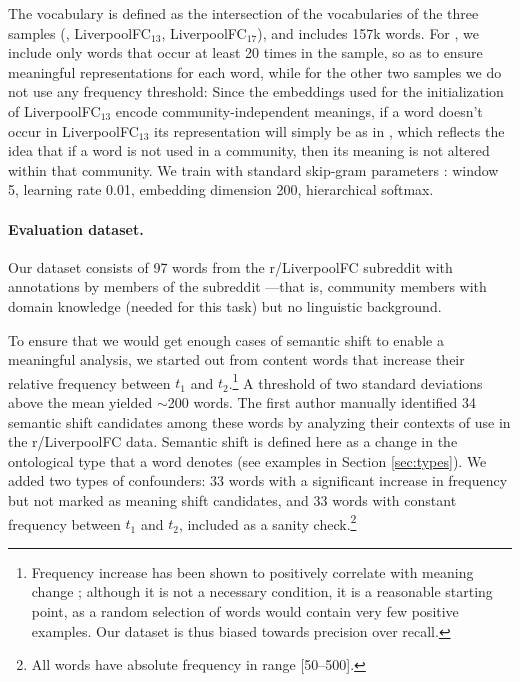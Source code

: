 The vocabulary is defined as the intersection of the
vocabularies of the three samples (\redd, LiverpoolFC$_{13}$,
LiverpoolFC$_{17}$), and includes 157k words.
For \redd, we include only words that occur at least 20 times in the
sample, so as to ensure meaningful representations for each word,
while for the other two samples we do not use any frequency
threshold: Since the embeddings used for the initialization of
LiverpoolFC$_{13}$ encode community-independent meanings, if a word doesn't occur in
LiverpoolFC$_{13}$ its representation will simply be as in \redd,
which reflects the idea that if a word is not used in a community, then its meaning is not altered within
that community. 
We train with standard skip-gram parameters \cite{levy2015improving}: window 5, learning rate 0.01, embedding dimension 200, hierarchical softmax.




\paragraph{Evaluation dataset.}

Our dataset consists of 97 words from the r/LiverpoolFC subreddit with
annotations by members of the subreddit ---that is, community members
with domain knowledge (needed for this task) but no linguistic
background.

To ensure that we would get enough cases of semantic shift to enable a
meaningful analysis, we started out from content words that increase
their relative frequency between $t_1$ and $t_2$.\footnote{Frequency
  increase has been shown to positively correlate with meaning change
  \cite{wijaya2011understanding,kulkarni2015statistically}; although
  it is not a necessary condition, it is a reasonable starting point,
  as a random selection of words would contain very few positive
  examples. Our dataset is thus biased towards precision over recall.}
A threshold of two standard deviations above the mean yielded
$\sim$200 words. The first author manually identified 34 semantic
shift candidates among these words by analyzing their contexts of use
in the r/LiverpoolFC data.  Semantic shift is defined here as a change
in the ontological type that a word denotes (see examples in
Section \ref{sec:types}). We added two types of confounders: 33 words
with a significant increase in frequency but not marked as meaning
shift candidates, and 33 words with constant frequency between $t_1$
and $t_2$, included as a sanity check.\footnote{All words have
  absolute frequency in range [50--500].}

